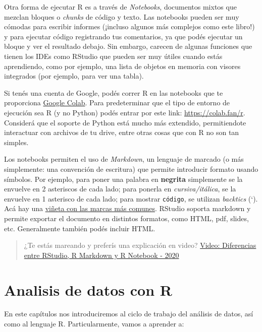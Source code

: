 \documentclass[
]{book}
\begin{document}
Otra forma de ejecutar R es a través de \emph{Notebooks}, documentos mixtos que mezclan bloques o \emph{chunks} de código y texto. Las notebooks pueden ser muy cómodas para escribir informes (¡incluso algunos más complejos como este libro!) y para ejecutar código registrando tus comentarios, ya que podés ejecutar un bloque y ver el resultado debajo.
Sin embargo, carecen de algunas funciones que tienen los IDEs como RStudio que pueden ser muy útiles cuando estás aprendiendo, como por ejemplo, una lista de objetos en memoria con visores integrados (por ejemplo, para ver una tabla).

Si tenés una cuenta de Google, podés correr R en las notebooks que te proporciona \href{https://colab.research.google.com/}{Google Colab}. Para predeterminar que el tipo de entorno de ejecución sea R (y no Python) podés entrar por este link: \url{https://colab.fan/r}. Considerá que el soporte de Python está mucho más extendido, permitiendote interactuar con archivos de tu drive, entre otras cosas que con R no son tan simples.

Los notebooks permiten el uso de \emph{Markdown}, un lenguaje de marcado (o más simplemente: una convención de escritura) que permite introducir formato usando símbolos. Por ejemplo, para poner una palabra en \textbf{negrita} simplemente se la envuelve en 2 asteriscos de cada lado; para ponerla en \emph{cursiva/itálica}, se la envuelve en 1 asterisco de cada lado; para mostrar \texttt{código}, se utilizan \emph{backtics} (`). Acá hay una \href{https://www.rstudio.com/wp-content/uploads/2015/02/rmarkdown-cheatsheet.pdf}{viñeta con las marcas más comunes}. RStudio soporta markdown y permite exportar el documento en distintos formatos, como HTML, pdf, slides, etc. Generalmente también podés incluir HTML.

\begin{quote}
¿Te estás mareando y preferís una explicación en video? \href{https://www.youtube.com/watch?v=y7JPGlw6dJg}{Video: Diferencias entre RStudio, R Markdown y R Notebook - 2020}
\end{quote}

\hypertarget{analisis-de-datos-con-r}{%
\chapter{Analisis de datos con R}\label{analisis-de-datos-con-r}}

En este capítulos nos introduciremos al ciclo de trabajo del análisis de datos, así como al lenguaje R. Particularmente, vamos a aprender a:
\end{document}
